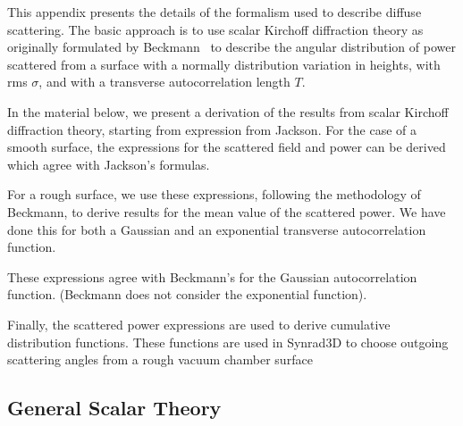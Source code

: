 \documentclass[11pt]{article}
\begin{document}
{{{{This appendix presents the details of the formalism used to describe
diffuse scattering. The basic approach is to use scalar Kirchoff
diffraction theory as originally formulated by
Beckmann~\cite{b:beckmann} to describe the angular distribution of
power scattered from a surface with a normally distribution variation
in heights, with rms $\sigma$, and with a transverse autocorrelation
length $T$.

In the material below, we present a derivation of the results from
scalar Kirchoff diffraction theory, starting from expression from
Jackson. For the case of a smooth surface, the expressions for the
scattered field and power can be derived which agree with Jackson's
formulas.

For a rough surface, we use these expressions, following the
methodology of Beckmann, to derive results for the mean value of the
scattered power. We have done this for both a Gaussian and an
exponential transverse autocorrelation function.

These expressions agree with Beckmann's for the Gaussian
autocorrelation function. (Beckmann does not consider the exponential
function).

Finally, the scattered power expressions are used to derive cumulative
distribution functions. These functions are used in Synrad3D to choose
outgoing scattering angles from a rough vacuum chamber surface

\subsection{General Scalar Theory} 

}}}}
\end{document}
